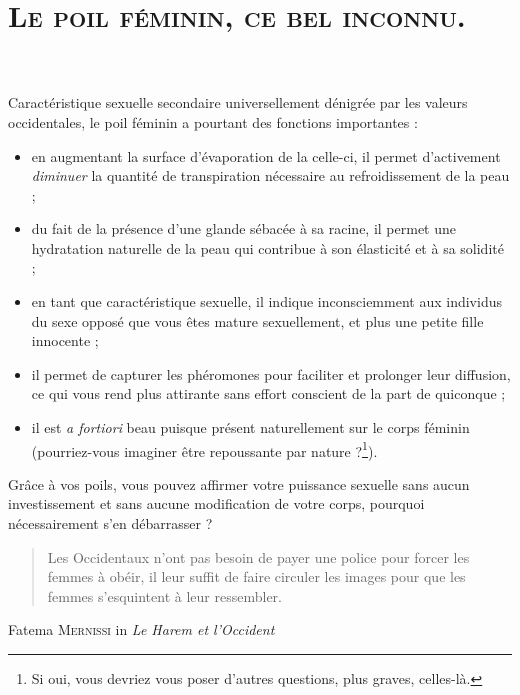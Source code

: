 \documentclass[a4paper,11pt]{article}
\begin{document}
\part*{\textsc{Le poil féminin, ce bel inconnu.}}\\
\\
Caractéristique sexuelle secondaire universellement dénigrée par les valeurs
occidentales, le poil féminin a pourtant des fonctions importantes : \\

\begin{itemize}
\item en augmentant la surface d’évaporation de la celle-ci, il permet
d’activement \emph{diminuer} la quantité de transpiration nécessaire au
refroidissement de la peau ;
\item du fait de la présence d’une glande sébacée à sa racine, il permet une
hydratation naturelle de la peau qui contribue à son élasticité et à sa
solidité ;
\item en tant que caractéristique sexuelle, il indique inconsciemment aux
individus du sexe opposé que vous êtes mature sexuellement, et plus une petite
fille innocente ;
\item il permet de capturer les phéromones pour faciliter et prolonger leur
diffusion, ce qui vous rend plus attirante sans effort conscient de la part de
quiconque ;
\item il est \emph{a fortiori} beau puisque présent naturellement sur le corps
féminin (pourriez-vous imaginer être repoussante par nature ?\footnote{Si oui,
vous devriez vous poser d’autres questions, plus graves, celles-là.}).
\end{itemize}

Grâce à vos poils, vous pouvez affirmer votre puissance sexuelle sans aucun
investissement et sans aucune modification de votre corps, pourquoi
nécessairement s’en débarrasser ?

\begin{quote}
Les Occidentaux n'ont pas besoin de payer une police pour forcer les femmes à
obéir, il leur suffit de faire circuler les images pour que les femmes
s'esquintent à leur ressembler.
\end{quote}
Fatema \textsc{Mernissi} in \emph{Le Harem et l'Occident}
\end{document}
